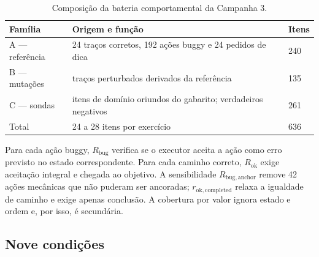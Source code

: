 \documentclass[11pt,a4paper]{article}
\newcommand{\Rbug}{\ensuremath{R_{\mathrm{bug}}}}
\newcommand{\Rok}{\ensuremath{R_{\mathrm{ok}}}}
\newcommand{\Rbuganchor}{\ensuremath{R_{\mathrm{bug,anchor}}}}
\newcommand{\Rokcompleted}{\ensuremath{r_{\mathrm{ok,completed}}}}
\begin{document}
\begin{table}[htbp]
\centering
\caption{Composição da bateria comportamental da Campanha 3.}
\label{tab:c3-battery}
\small
\begin{tabularx}{\textwidth}{@{}P{3.4cm}Y R{1.8cm}@{}}
\toprule
Família & Origem e função & Itens \\
\midrule
A --- referência & 24 traços corretos, 192 ações buggy e 24 pedidos de dica & 240 \\
B --- mutações & traços perturbados derivados da referência & 135 \\
C --- sondas & itens de domínio oriundos do gabarito; verdadeiros negativos & 261 \\
\midrule
Total & 24 a 28 itens por exercício & 636 \\
\bottomrule
\end{tabularx}
\end{table}

Para cada ação buggy, \Rbug{} verifica se o executor aceita a ação como erro previsto no estado correspondente. Para cada caminho correto, \Rok{} exige aceitação integral e chegada ao objetivo. A sensibilidade \Rbuganchor{} remove 42 ações mecânicas que não puderam ser ancoradas; \Rokcompleted{} relaxa a igualdade de caminho e exige apenas conclusão. A cobertura por valor ignora estado e ordem e, por isso, é secundária.

\subsection{Nove condições}
\end{document}
